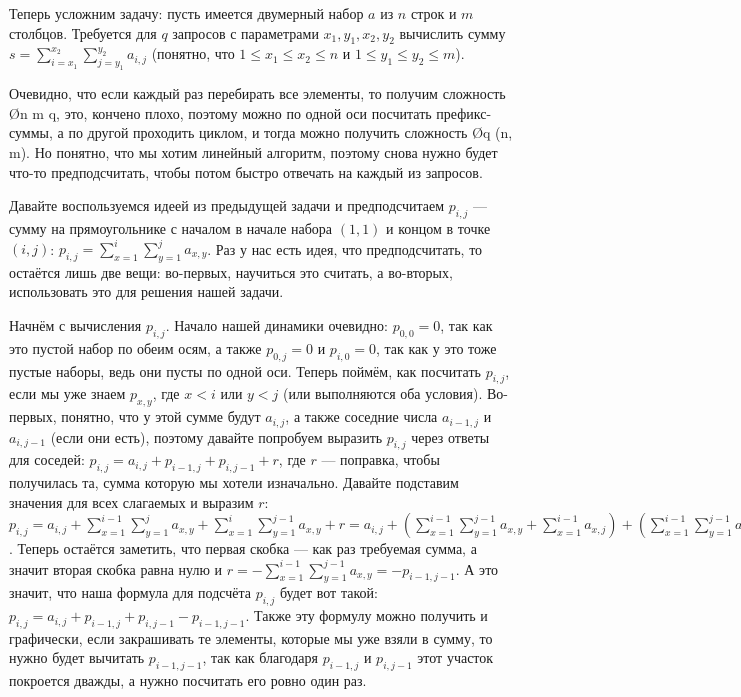 Теперь усложним задачу: пусть имеется двумерный набор $a$ из $n$ строк и $m$ столбцов. Требуется для $q$ запросов с параметрами $x_1, y_1, x_2, y_2$ вычислить сумму $s = \sum\limits_{i = x_1}^{x_2} \sum\limits_{j = y_1}^{y_2} a_{i, j}$ (понятно, что $1 \leq x_1 \leq x_2 \leq n$ и $1 \leq y_1 \leq y_2 \leq m$).

Очевидно, что если каждый раз перебирать все элементы, то получим сложность \O{n \cdot m \cdot q}, это, кончено плохо, поэтому можно по одной оси посчитать префикс-суммы, а по другой проходить циклом, и тогда можно получить сложность \O{q \cdot \min(n, m)}. Но понятно, что мы хотим линейный алгоритм, поэтому снова нужно будет что-то предподсчитать, чтобы потом быстро отвечать на каждый из запросов.

Давайте воспользуемся идеей из предыдущей задачи и предподсчитаем $p_{i, j}$ — сумму на прямоугольнике с началом в начале набора $(1, 1)$ и концом в точке $(i, j)$: $p_{i, j} = \sum\limits_{x = 1}^{i} \sum\limits_{y = 1}^{j} a_{x, y}$. Раз у нас есть идея, что предподсчитать, то остаётся лишь две вещи: во-первых, научиться это считать, а во-вторых, использовать это для решения нашей задачи.

Начнём с вычисления $p_{i, j}$. Начало нашей динамики очевидно: $p_{0, 0} = 0$, так как это пустой набор по обеим осям, а также $p_{0, j} = 0$ и $p_{i, 0} = 0$, так как у это тоже пустые наборы, ведь они пусты по одной оси. Теперь поймём, как посчитать $p_{i, j}$, если мы уже знаем $p_{x, y}$, где $x < i$ или $y < j$ (или выполняются оба условия). Во-первых, понятно, что у этой сумме будут $a_{i, j}$, а также соседние числа $a_{i - 1, j}$ и $a_{i, j - 1}$ (если они есть), поэтому давайте попробуем выразить $p_{i, j}$ через ответы для соседей: $p_{i, j} = a_{i, j} + p_{i - 1, j} + p_{i, j - 1} + r$, где $r$ — поправка, чтобы получилась та, сумма  которую мы хотели изначально. Давайте подставим значения для всех слагаемых и выразим $r$: $p_{i, j} = a_{i, j} + \sum\limits_{x = 1}^{i - 1} \sum\limits_{y = 1}^{j} a_{x, y} + \sum\limits_{x = 1}^{i} \sum\limits_{y = 1}^{j - 1} a_{x, y} + r = a_{i, j} + \left( \sum\limits_{x = 1}^{i - 1} \sum\limits_{y = 1}^{j - 1} a_{x, y} + \sum\limits_{x=1}^{i - 1} a_{x, j} \right) + \left( \sum\limits_{x = 1}^{i - 1} \sum\limits_{y = 1}^{j - 1} a_{x, y} + \sum\limits_{y=1}^{j - 1} a_{i, j} \right) + r = \left( a_{i, j} + \sum\limits_{x = 1}^{i - 1} \sum\limits_{y = 1}^{j - 1} a_{x, y} + \sum\limits_{x=1}^{i - 1} a_{x, j} + \sum\limits_{y=1}^{j - 1} a_{i, j} \right) + \left( \sum\limits_{x = 1}^{i - 1} \sum\limits_{y = 1}^{j - 1} a_{x, y} + r \right)$. Теперь остаётся заметить, что первая скобка — как раз требуемая сумма, а значит вторая скобка равна нулю и $r = -\sum\limits_{x = 1}^{i - 1} \sum\limits_{y = 1}^{j - 1} a_{x, y} = -p_{i - 1, j - 1}$. А это значит, что наша формула для подсчёта $p_{i, j}$ будет вот такой:  $p_{i, j} = a_{i, j} + p_{i - 1, j} + p_{i, j - 1} - p_{i - 1, j - 1}$. Также эту формулу можно получить и графически, если закрашивать те элементы, которые мы уже взяли в сумму, то нужно будет вычитать $p_{i - 1, j - 1}$, так как благодаря $p_{i - 1, j}$ и $p_{i, j - 1}$ этот участок покроется дважды, а нужно посчитать его ровно один раз.

